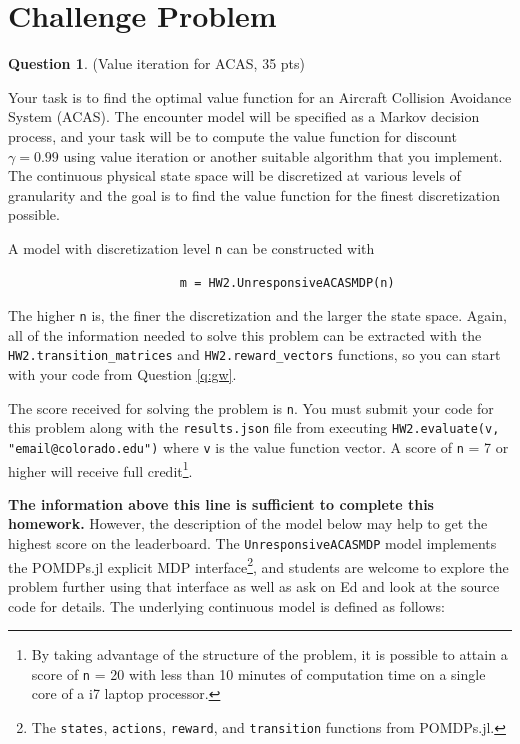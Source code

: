 \documentclass{article}
\theoremstyle{definition}
\newtheorem{question}[thm]{Question}
\begin{document}
\section{Challenge Problem}

\begin{question}
    (Value iteration for ACAS, 35 pts)

Your task is to find the optimal value function for an Aircraft Collision Avoidance System (ACAS). The encounter model will be specified as a Markov decision process, and your task will be to compute the value function for discount $\gamma=0.99$ using value iteration or another suitable algorithm that you implement. The continuous physical state space will be discretized at various levels of granularity and the goal is to find the value function for the finest discretization possible.

A model with discretization level \texttt{n} can be constructed with
\begin{verbatim}
                        m = HW2.UnresponsiveACASMDP(n)
\end{verbatim}
The higher \texttt{n} is, the finer the discretization and the larger the state space. Again, all of the information needed to solve this problem can be extracted with the \texttt{HW2.transition\_matrices} and \texttt{HW2.reward\_vectors} functions, so you can start with your code from Question \ref{q:gw}.

The score received for solving the problem is \texttt{n}. You must submit your code for this problem along with the \texttt{results.json} file from executing \texttt{HW2.evaluate(v, "email@colorado.edu")} where \texttt{v} is the value function vector. A score of \texttt{n} = 7 or higher will receive full credit\footnote{By taking advantage of the structure of the problem, it is possible to attain a score of \texttt{n} = 20 with less than 10 minutes of computation time on a single core of a i7 laptop processor.}.

\vspace{1em}
\noindent\makebox[\linewidth]{\rule{\textwidth}{0.4pt}}
\vspace{1em}

\textbf{The information above this line is sufficient to complete this homework.} However, the description of the model below may help to get the highest score on the leaderboard. The \texttt{UnresponsiveACASMDP} model implements the POMDPs.jl explicit MDP interface\footnote{The \texttt{states}, \texttt{actions}, \texttt{reward}, and \texttt{transition} functions from POMDPs.jl.}, and students are welcome to explore the problem further using that interface as well as ask on Ed and look at the source code for details. The underlying continuous model is defined as follows:


\end{question}
\end{document}
